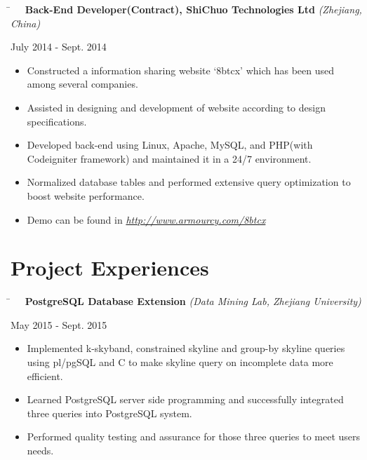 \documentclass[10pt]{article} %
\begin{document}
\vspace{-1mm}
\parbox{0.5\textwidth}{ %
\begin{tabbing}
\hspace{4mm} \= \kill
\>\textbf{\ \ Back-End Developer(Contract), ShiChuo Technologies Ltd} \textit{(Zhejiang, China)}
\end{tabbing}
}
\hfill
\parbox{0.5\textwidth}{
\begin{tabbing}
July 2014 - Sept. 2014
\end{tabbing}
}
\vspace{-3mm}
\begin{itemize}[leftmargin=16mm]
		\item Constructed a information sharing website `8btcx' which has been used among several companies.
		\item Assisted in designing and development of website according to design specifications.
		\item Developed back-end using Linux, Apache, MySQL, and PHP(with Codeigniter framework) and maintained it in a 24/7 environment.
		\item Normalized database tables and performed extensive query optimization to boost website performance.
        \item Demo can be found in \textit{\underline{http://www.armourcy.com/8btcx}}
\end{itemize}



\section{Project Experiences}

\parbox{0.5\textwidth}{
\begin{tabbing}
\hspace{4mm} \= \kill
\>\textbf{\ \ PostgreSQL Database Extension} \textit{(Data Mining Lab, Zhejiang University)}
\end{tabbing}
}
\hfill
\parbox{0.5\textwidth}{
\begin{tabbing}
May 2015 - Sept. 2015
\end{tabbing}
}
\vspace{-3mm}
\begin{itemize}[leftmargin=16mm]
        \item Implemented k-skyband, constrained skyline and group-by skyline queries using pl/pgSQL and C to make skyline query on incomplete data more efficient.
        \item Learned PostgreSQL server side programming and successfully integrated three queries into PostgreSQL system.
        \item Performed quality testing and assurance for those three queries to meet users needs.
\end{itemize}
\end{document}
